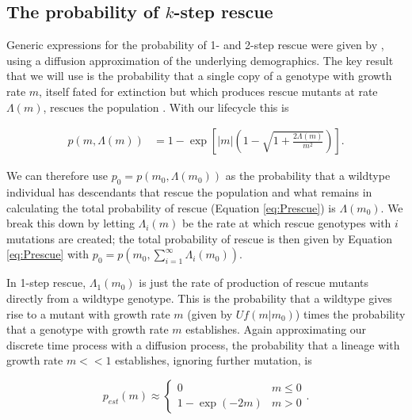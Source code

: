 \documentclass[9pt,twocolumn,twoside,lineno]{gsajnl}
\begin{document}
\subsection{The probability of $k$-step rescue}

Generic expressions for the probability of 1- and 2-step rescue were given by \cite{Martin2013}, using a diffusion approximation of the underlying demographics.
The key result that we will use is the probability that a single copy of a genotype with growth rate $m$, itself fated for extinction but which produces rescue mutants at rate $\Lambda(m)$, rescues the population \citep[equation S1.5 in][]{Martin2013}.
With our lifecycle this is \citep[c.f., equation A.3 in][]{Iwasa2004}

\begin{equation}\label{eq:S15}
\begin{aligned}
p(m,\Lambda(m)) 
   &= 1 - \exp \left[  |m| \left(1 - \sqrt{1+\frac{2\Lambda(m)}{m^2}} \right) \right].
\end{aligned}
\end{equation}

\noindent We can therefore use $p_0 = p(m_0,\Lambda(m_0))$ as the probability that a wildtype individual has descendants that rescue the population and what remains in calculating the total probability of rescue (Equation \ref{eq:Prescue}) is $\Lambda(m_0)$.
We break this down by letting $\Lambda_i(m)$ be the rate at which rescue genotypes with $i$ mutations are created; the total probability of rescue is then given by Equation \ref{eq:Prescue} with $p_0=p(m_0, \sum_{i=1}^\infty\Lambda_i(m_0))$.

In 1-step rescue, $\Lambda_1(m_0)$ is just the rate of production of rescue mutants directly from a wildtype genotype.
This is the probability that a wildtype gives rise to a mutant with growth rate $m$ (given by $U f(m|m_0)$) times the probability that a genotype with growth rate $m$ establishes.
Again approximating our discrete time process with a diffusion process, the probability that a lineage with growth rate $m<<1$ establishes, ignoring further mutation, is \citep[e.g.,][]{Martin2013}

\begin{equation}\label{eq:pestm}
p_{est}(m) \approx
\begin{cases}
	0 & m \leq 0 \\
	1-\exp(-2 m) & m > 0
\end{cases}.
\end{equation}
\end{document}

